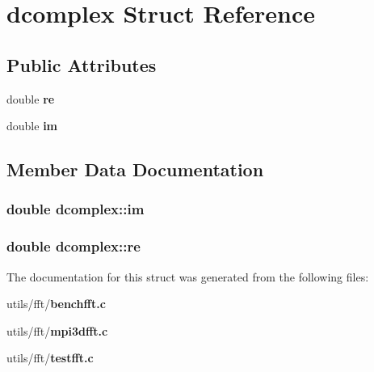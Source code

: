 \section{dcomplex Struct Reference}
\label{structdcomplex}
\subsection*{Public Attributes}
\begin{CompactItemize}
\item 
double {\bf re}
\item 
double {\bf im}
\end{CompactItemize}


\subsection{Member Data Documentation}
\subsubsection{\setlength{\rightskip}{0pt plus 5cm}double {\bf dcomplex::im}}\label{structdcomplex_be95c8de1a1e3673cd15fa0387f45357}


\subsubsection{\setlength{\rightskip}{0pt plus 5cm}double {\bf dcomplex::re}}\label{structdcomplex_b830dabd7dee3b31d225d602ea017ea7}




The documentation for this struct was generated from the following files:\begin{CompactItemize}
\item 
utils/fft/{\bf benchfft.c}\item 
utils/fft/{\bf mpi3dfft.c}\item 
utils/fft/{\bf testfft.c}\end{CompactItemize}
